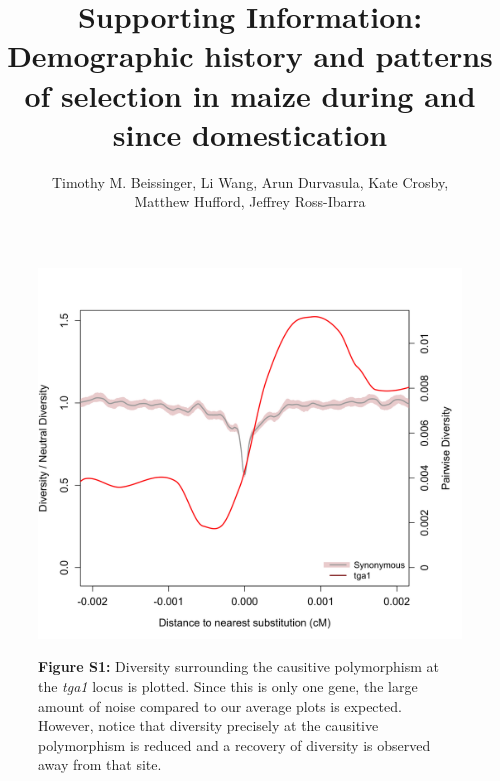 \documentclass{article}
\begin{document}
\title{Supporting Information: Demographic history and patterns of selection in maize during and since domestication}
\author{Timothy M. Beissinger, Li Wang, Arun Durvasula, Kate Crosby, \\ Matthew Hufford, Jeffrey Ross-Ibarra}

\maketitle
\section*{}


\begin{figure}[h!]
  \begin{center}
    \includegraphics[width=.85\textwidth]{FigsAndFiles/plotDiversity_TvM_Folded2_Significance_tga1Supp_June.png} \\
    \end{center}
{\bf Figure S1:} Diversity surrounding the causitive polymorphism at the \emph{tga1} locus is plotted. Since this is only one gene, the large amount of noise compared to our average plots is expected. However, notice that diversity precisely at the causitive polymorphism is reduced and a recovery of diversity is observed away from that site.
\end{figure}
\end{document}
